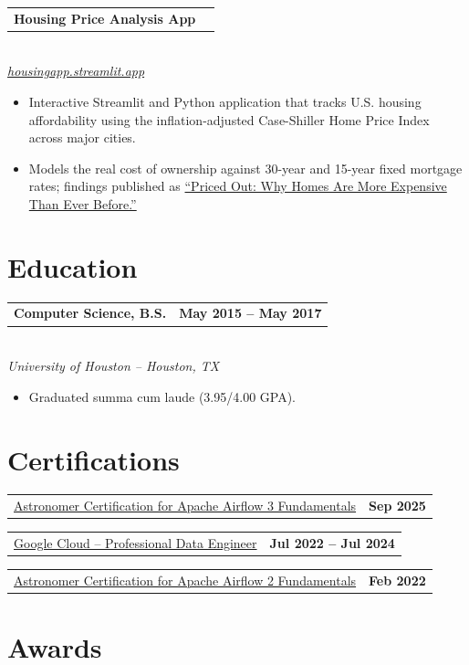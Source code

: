 \documentclass[10pt,letterpaper]{article}
\makeatletter
\newlength{\entryindent}
\newcommand{\entry}[3]{%
  \vspace{3.5pt}%
  \hspace*{\entryindent}%
  \begin{minipage}{\dimexpr\linewidth-\entryindent\relax}
    \begin{tabular*}{\linewidth}{@{}l@{\extracolsep{\fill}}r@{}}
      \textbf{#1} & \textbf{#3}
    \end{tabular*}\\
    \textit{#2}
  \end{minipage}%
  \par
}
\newcommand{\plainrow}[2]{%
  \hspace*{\entryindent}%
  \begin{minipage}{\dimexpr\linewidth-\entryindent\relax}
    \begin{tabular*}{\linewidth}{@{}l@{\extracolsep{\fill}}r@{}}
      #1 & \textbf{#2}
    \end{tabular*}
  \end{minipage}%
  \par
}
\newenvironment{bullets}
  {\begin{itemize}[leftmargin=0.6in,labelsep=0.09in,label=\textbullet,
                   topsep=1pt,itemsep=0pt,parsep=0pt]}
  {\end{itemize}}
\makeatother
\begin{document}
\entry{Housing Price Analysis App}
      {\href{https://housingapp.streamlit.app/}{housingapp.streamlit.app}}
      {}
\begin{bullets}
  \item Interactive Streamlit and Python application that tracks U.S. housing affordability using the inflation-adjusted Case-Shiller Home Price Index across major cities.
  \item Models the real cost of ownership against 30-year and 15-year fixed mortgage rates; findings published as \href{https://medium.com/@salimelawad/priced-out-why-homes-are-more-expensive-than-ever-before-7ed72b0fd357}{``Priced Out: Why Homes Are More Expensive Than Ever Before.''}
\end{bullets}

\section*{Education}

\entry{Computer Science, B.S.}
      {University of Houston -- Houston, TX}
      {May 2015 -- May 2017}
\begin{bullets}
  \item Graduated summa cum laude (3.95/4.00 GPA).
\end{bullets}

\section*{Certifications}
\vspace{3pt}

\plainrow{\href{https://www.credly.com/badges/41d9954e-247b-43fd-8bdc-08b0860dc1c8}{Astronomer Certification for Apache Airflow 3 Fundamentals}}{Sep 2025}
\plainrow{\href{https://www.credential.net/58b39e0d-1585-417a-8907-011a96726489}{Google Cloud -- Professional Data Engineer}}{Jul 2022 -- Jul 2024}
\plainrow{\href{https://www.credly.com/badges/8214dbae-0057-475b-9493-77a4c9c950eb}{Astronomer Certification for Apache Airflow 2 Fundamentals}}{Feb 2022}

\section*{Awards}
\vspace{3pt}
\end{document}
